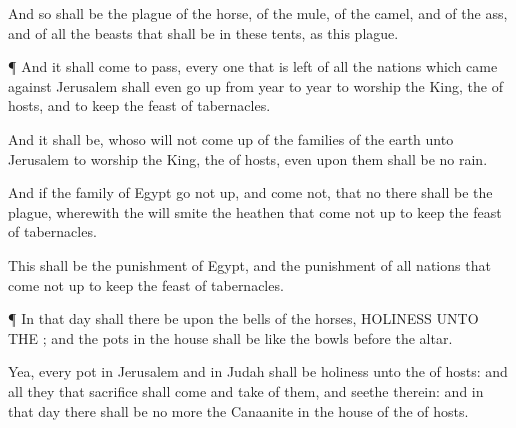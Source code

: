 {And so shall be the
plague of the
horse, of the
mule, of the
camel, and of the
ass, and of all the
beasts that shall be in
these
tents, as this
plague.


\par }{\PP {}¶ And it shall come to pass,
{} every one that is
left of all the
nations which
came against
Jerusalem shall even go
up
from
year to
year to
worship the
King, the
{} of
hosts, and to
keep the
feast of
tabernacles.

And it shall be,
{} whoso will not come
up of
{} the
families of the
earth unto
Jerusalem to
worship the
King, the
{} of
hosts, even upon them shall be no
rain.

And if the
family of
Egypt go not
up, and
come not, that
{} no
{} there shall be the
plague, wherewith the
{} will
smite the
heathen that come not
up to
keep the
feast of
tabernacles.

This shall be the
punishment of
Egypt, and the
punishment of all
nations that come not
up to
keep the
feast of
tabernacles.


\par }{\PP {}¶ In that
day shall there be upon the
bells of the
horses,
HOLINESS UNTO THE
{}; and the
pots in the
{}
house shall be like the
bowls
before the
altar.

Yea, every
pot in
Jerusalem and in
Judah shall be
holiness unto the
{} of
hosts: and all they that
sacrifice shall
come and
take of them, and
seethe therein: and in that
day there shall be no more the
Canaanite in the
house of the
{} of
hosts.


\par }